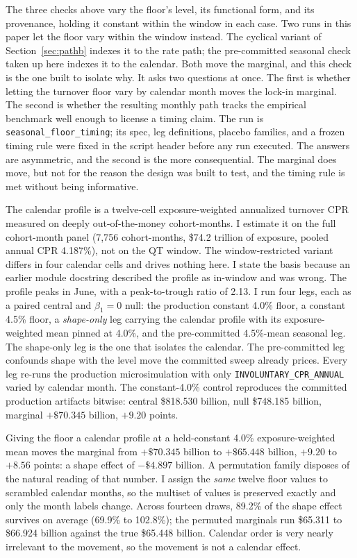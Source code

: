 \documentclass[12pt]{article}
\begin{document}
The three checks above vary the floor's level, its functional form, and its provenance, holding it constant within the window in each case. Two runs in this paper let the floor vary within the window instead. The cyclical variant of Section~\ref{sec:pathb} indexes it to the rate path; the pre-committed seasonal check taken up here indexes it to the calendar. Both move the marginal, and this check is the one built to isolate why. It asks two questions at once. The first is whether letting the turnover floor vary by calendar month moves the lock-in marginal. The second is whether the resulting monthly path tracks the empirical benchmark well enough to license a timing claim. The run is \texttt{seasonal\_floor\_timing}; its spec, leg definitions, placebo families, and a frozen timing rule were fixed in the script header before any run executed. The answers are asymmetric, and the second is the more consequential. The marginal does move, but not for the reason the design was built to test, and the timing rule is met without being informative.

The calendar profile is a twelve-cell exposure-weighted annualized turnover CPR measured on deeply out-of-the-money cohort-months. I estimate it on the full cohort-month panel (7{,}756 cohort-months, \$74.2 trillion of exposure, pooled annual CPR 4.187\%), not on the QT window. The window-restricted variant differs in four calendar cells and drives nothing here. I state the basis because an earlier module docstring described the profile as in-window and was wrong. The profile peaks in June, with a peak-to-trough ratio of 2.13. I run four legs, each as a paired central and $\beta_1 = 0$ null: the production constant 4.0\% floor, a constant 4.5\% floor, a \emph{shape-only} leg carrying the calendar profile with its exposure-weighted mean pinned at 4.0\%, and the pre-committed 4.5\%-mean seasonal leg. The shape-only leg is the one that isolates the calendar. The pre-committed leg confounds shape with the level move the committed sweep already prices. Every leg re-runs the production microsimulation with only \texttt{INVOLUNTARY\_CPR\_ANNUAL} varied by calendar month. The constant-4.0\% control reproduces the committed production artifacts bitwise: central \$818.530 billion, null \$748.185 billion, marginal $+\$70.345$ billion, $+9.20$ points.

Giving the floor a calendar profile at a held-constant 4.0\% exposure-weighted mean moves the marginal from $+\$70.345$ billion to $+\$65.448$ billion, $+9.20$ to $+8.56$ points: a shape effect of $-\$4.897$ billion. A permutation family disposes of the natural reading of that number. I assign the \emph{same} twelve floor values to scrambled calendar months, so the multiset of values is preserved exactly and only the month labels change. Across fourteen draws, 89.2\% of the shape effect survives on average (69.9\% to 102.8\%); the permuted marginals run \$65.311 to \$66.924 billion against the true \$65.448 billion. Calendar order is very nearly irrelevant to the movement, so the movement is not a calendar effect.
\end{document}

